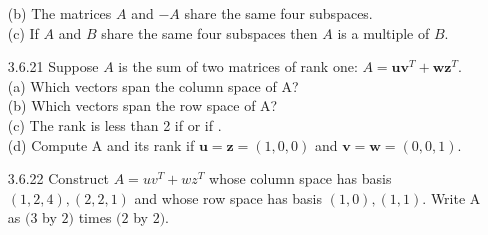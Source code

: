 \documentclass[10pt,twoside,reqno]{article}
\begin{document}
\begin{enumerate}
(b) The matrices $A$ and $-A$ share the same four subspaces.\\



(c) If $A$ and $B$ share the same four subspaces then $A$ is a multiple of $B$.\\
\vspace{3mm}



\item[3.6.21] Suppose $A$ is the sum of two matrices of rank one: $A = \pmb{u}\pmb{v}^T + \pmb{w}\pmb{z}^T$.\\
(a) Which vectors span the column space of A?\\



(b) Which vectors span the row space of A?\\



(c) The rank is less than 2 if \underline{\hspace{7mm}} or if \underline{\hspace{7mm}}.\\



(d) Compute A and its rank if $\pmb{u} = \pmb{z} = (1, 0, 0)$ and $\pmb{v} = \pmb{w} = (0, 0, 1)$.\\
\vspace{3mm} 



\item[3.6.22] Construct $A = uv^T + wz^T$ whose column space has basis $(1, 2, 4), (2, 2, 1)$ and whose row space has basis $(1, 0), (1, 1)$. Write A as $(3$ by $2)$ times $(2$ by $2)$.\\
\vspace{3mm} 




\end{enumerate}
\end{document}
